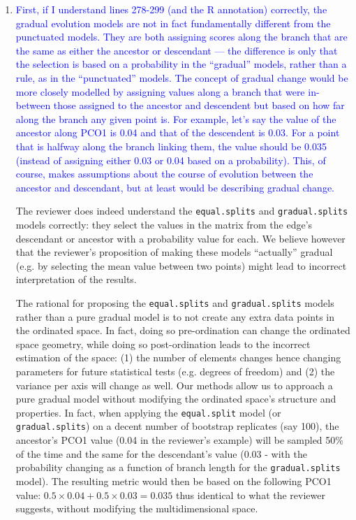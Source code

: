 \documentclass[12pt,letterpaper]{article}
\begin{document}
\begin{enumerate}

\item{\textcolor{blue}{First, if I understand lines 278-299 (and the R annotation) correctly, the gradual evolution models are not in fact fundamentally different from the punctuated models. They are both assigning scores along the branch that are the same as either the ancestor or descendant — the difference is only that the selection is based on a probability in the ``gradual'' models, rather than a rule, as in the ``punctuated'' models. The concept of gradual change would be more closely modelled by assigning values along a branch that were in-between those assigned to the ancestor and descendent but based on how far along the branch any given point is. For example, let's say the value of the ancestor along PCO1 is 0.04 and that of the descendent is 0.03. For a point that is halfway along the branch linking them, the value should be 0.035 (instead of assigning either 0.03 or 0.04 based on a probability). This, of course, makes assumptions about the course of evolution between the ancestor and descendant, but at least would be describing gradual change.}}

The reviewer does indeed understand the \texttt{equal.splits} and \texttt{gradual.splits} models correctly: they select the values in the matrix from the edge's descendant or ancestor with a probability value for each.
We believe however that the reviewer's proposition of making these models ``actually'' gradual (e.g. by selecting the mean value between two points) might lead to incorrect interpretation of the results.

The rational for proposing the \texttt{equal.splits} and \texttt{gradual.splits} models rather than a pure gradual model is to not create any extra data points in the ordinated space.
In fact, doing so pre-ordination can change the ordinated space geometry, while doing so post-ordination leads to the incorrect estimation of the space: (1) the number of elements changes hence changing parameters for future statistical tests (e.g. degrees of freedom) and (2) the variance per axis will change as well.
Our methods allow us to approach a pure gradual model without modifying the ordinated space's structure and properties.
In fact, when applying the \texttt{equal.split} model (or \texttt{gradual.splits}) on a decent number of bootstrap replicates (say 100), the ancestor's PCO1 value (0.04 in the reviewer's example) will be sampled 50\% of the time and the same for the descendant's value (0.03 - with the probability changing as a function of branch length for the \texttt{gradual.splits} model).
The resulting metric would then be based on the following PCO1 value: $0.5\times0.04 + 0.5\times0.03 = 0.035$ thus identical to what the reviewer suggests, without modifying the multidimensional space.


\end{enumerate}
\end{document}
